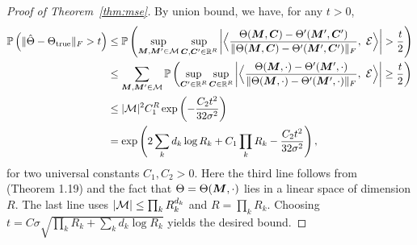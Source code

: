 \documentclass{article}
\newtheorem{lemma}{Lemma}
\begin{document}
\begin{appendices}
\begin{proof}[Proof of Theorem~\ref{thm:mse}]
By union bound, we have, for any $t>0$,
\begin{equation}
\begin{split}
\mathbb{P}\left(\FnormSize{}{\hat \Theta-\trueT} > t\right)&\leq \mathbb{P}\left(\sup_{\mM, \mM'\in \tM}\sup_{\mC, \mC'\in \mathbb{R}^R} \left|\Big\langle {\Theta(\mM,\mC)-\Theta'(\mM',\mC')\over \FnormSize{}{\Theta(\mM,\mC)-\Theta'(\mM',\mC')}}, \ \tE\Big\rangle\right|>{t\over 2}\right)\\
&\leq \sum_{\mM, \mM'\in \tM}\mathbb{P}\left(\sup_{\mC'\in \mathbb{R}^R}\sup_{\mC\in \mathbb{R}^R}\left|\Big\langle {\Theta(\mM,\cdot)-\Theta'(\mM',\cdot)\over \FnormSize{}{\Theta(\mM,\cdot)-\Theta'(\mM',\cdot)}},\ \tE\Big\rangle \right|\geq {t\over 2}\right)\\
&\leq |\tM|^2C_1^R\exp\left(-{C_2 t^2\over 32\sigma^2}\right)\\
&=\exp\left(2\sum_kd_k\log R_k+C_1\prod_k R_k-{C_2t^2\over 32\sigma^2}\right),
\end{split}
\end{equation}
for two universal constants $C_1, C_2>0$. Here the third line follows from~\cite{rigollet2015high} (Theorem 1.19) and the fact that $\Theta=\Theta(\boldsymbol{M},\cdot)$ lies in a linear space of dimension $R$. The last line uses $|\mathcal{M}|\leq \prod_k R_k^{d_k}$ and $R=\prod_k R_k$. Choosing $t=C\sigma\sqrt{\prod_k R_k+\sum_k d_k\log R_k}$ yields the desired bound. 
\end{proof}



\end{appendices}
\end{document}
